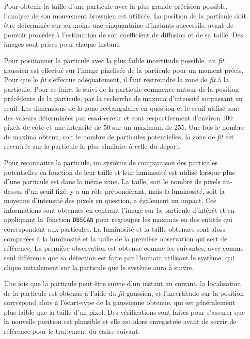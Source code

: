 \documentclass[11pt,letterpaper]{article}
\begin{document}
Pour obtenir la taille d'une particule avec la plus grande précision possible, l'analyse de son
mouvement brownien est utilisée. La position de la particule doit être 
déterminée sur au moins une cinquantaine d'instants successifs, avant de pouvoir procéder à l'estimation de son 
coefficient de diffusion et de sa taille. Des images sont prises pour chaque instant.

Pour positionner la particule avec la plus faible incertitude possible, un 
\textit{fit} gaussien est effectué sur l'image pixelisée de la particule pour un moment précis. Pour que le \textit{fit} s'effectue
adéquatement, il faut restreindre la zone de \textit{fit} à la particule. Pour ce faire, le suivi de la particule commence 
autour de la position précédente de la particule, par la recherche de maxima d'intensité surpassant un seuil. Les
dimensions de la zone rectangulaire en question et le seuil utilisé sont des valeurs déterminées par essai-erreur
et sont respectivement d'environ 100 pixels de côté et une intensité de 50 sur un maximum de 255.
Une fois le nombre de maxima obtenu, soit le nombre de particules potentielles, la zone de \textit{fit} est recentrée sur 
la particule la plus similaire à celle du départ.  

Pour reconnaitre la particule, un système de comparaison des particules potentielles en fonction de leur taille 
et leur luminosité est utilisé lorsque plus d'une particule est dans la même zone. 
La taille, soit le nombre de pixels au-dessus d'un seuil fixé, y a un rôle prépondérant, mais la luminosité, soit 
la moyenne d'intensité des pixels en question, a également un impact. Ces informations sont obtenues en centrant 
l'image sur la particule d'intérêt et en appliquant la\ fonction \texttt{DBSCAN} pour regrouper les maximas en des entités
qui correspondent aux particules. La luminosité et la taille obtenues sont alors comparées à la luminosité et la 
taille de la première observation qui sert de référence. La première observation est obtenue comme les suivantes,
avec comme seul différence que sa détection est faite par l'humain utilisant le système, qui clique initialement 
sur la particule que le système aura à suivre.

Une fois que la particule peut être suivie d'un instant au suivant, la localisation de la particule est obtenue à 
l'aide du \textit{fit} gaussien, et l'incertitude sur la position correspond alors à l'écart-type de la gaussienne obtenue, 
qui est généralement plus faible que la taille d'un pixel. 
Des vérifications sont faites pour s'assurer que la nouvelle position est plausible et elle est alors
enregistrée avant de servir de référence pour le traitement du cadre suivant.
\end{document}
